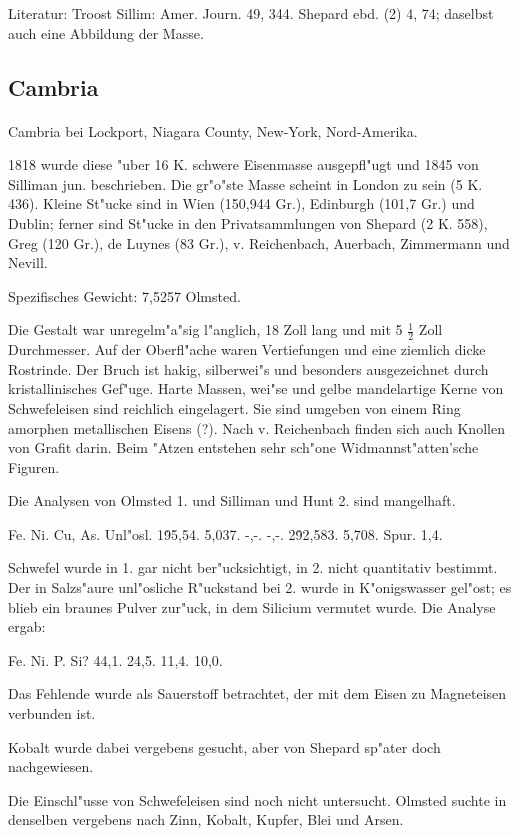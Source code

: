 \documentclass[a4paper, 11pt, oneside]{article}
\begin{document}
Literatur: Troost Sillim: Amer. Journ. 49, 344. Shepard ebd. (2) 4, 74; daselbst auch eine Abbildung der Masse.

\subsection{Cambria}
\normalsize
\paragraph{}
Cambria bei Lockport, Niagara County, New-York, Nord-Amerika.

1818 wurde diese "uber 16 K. schwere Eisenmasse ausgepfl"ugt und 1845 von Silliman jun. beschrieben. Die gr"o"ste Masse scheint in London zu sein (5 K. 436). Kleine St"ucke sind in Wien (150,944 Gr.), Edinburgh (101,7 Gr.) und Dublin; ferner sind St"ucke in den Privatsammlungen von Shepard (2 K. 558), Greg (120 Gr.), de Luynes (83 Gr.), v. Reichenbach, Auerbach, Zimmermann und Nevill.

Spezifisches Gewicht: 7,5257 Olmsted.

Die Gestalt war unregelm"a"sig l"anglich, 18 Zoll lang und mit 5 $\frac{1}{2}$ Zoll Durchmesser. Auf der Oberfl"ache waren Vertiefungen und eine ziemlich dicke Rostrinde. Der Bruch ist hakig, silberwei"s und besonders ausgezeichnet durch kristallinisches Gef"uge. Harte Massen, wei"se und gelbe mandelartige Kerne von Schwefeleisen sind reichlich eingelagert. Sie sind umgeben von einem Ring amorphen metallischen Eisens (?). Nach v. Reichenbach finden sich auch Knollen von Grafit darin. Beim "Atzen entstehen sehr sch"one Widmannst"atten'sche Figuren.

Die Analysen von Olmsted 1. und Silliman und Hunt 2. sind mangelhaft.

Fe. Ni. Cu, As. Unl"osl.  
1\. 95,54. 5,037. -,-. -,-.  
2\. 92,583. 5,708. Spur. 1,4.

Schwefel wurde in 1. gar nicht ber"ucksichtigt, in 2. nicht quantitativ bestimmt. Der in Salzs"aure unl"osliche R"uckstand bei 2. wurde in K"onigswasser gel"ost; es blieb ein braunes Pulver zur"uck, in dem Silicium vermutet wurde. Die Analyse ergab:

Fe. Ni. P. Si?  
44,1. 24,5. 11,4. 10,0.

Das Fehlende wurde als Sauerstoff betrachtet, der mit dem Eisen zu Magneteisen verbunden ist.

Kobalt wurde dabei vergebens gesucht, aber von Shepard sp"ater doch nachgewiesen.

Die Einschl"usse von Schwefeleisen sind noch nicht untersucht. Olmsted suchte in denselben vergebens nach Zinn, Kobalt, Kupfer, Blei und Arsen.
\end{document}
